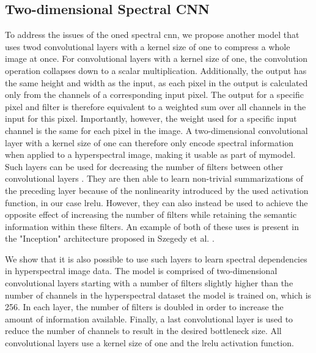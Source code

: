 \subsection{Two-dimensional Spectral CNN\label{sec:fastconv1d}}
To address the issues of the \ac{oned} spectral \ac{cnn}, we propose another model that uses \ac{twod} convolutional layers with a kernel size of one to compress a whole image at once. For convolutional layers with a kernel size of one, the convolution operation collapses down to a scalar multiplication. Additionally, the output has the same height and width as the input, as each pixel in the output is calculated only from the channels of a corresponding input pixel. The output for a specific pixel and filter is therefore equivalent to a weighted sum over all channels in the input for this pixel. Importantly, however, the weight used for a specific input channel is the same for each pixel in the image. A two-dimensional convolutional layer with a kernel size of one can therefore only encode spectral information when applied to a hyperspectral image, making it usable as part of \ac{mymodel}. Such layers can be used for decreasing the number of filters between other convolutional layers \citep{szegedy_going_2014}. They are then able to learn non-trivial summarizations of the preceding layer because of the nonlinearity introduced by the used activation function, in our case \ac{lrelu}. However, they can also instead be used to achieve the opposite effect of increasing the number of filters while retaining the semantic information within these filters. An example of both of these uses is present in the "Inception" architecture proposed in Szegedy et al. \citep{szegedy_going_2014}.

We show that it is also possible to use such layers to learn spectral dependencies in hyperspectral image data. The model is comprised of two-dimensional convolutional layers starting with a number of filters slightly higher than the number of channels in the hyperspectral dataset the model is trained on, which is 256. In each layer, the number of filters is doubled in order to increase the amount of information available. Finally, a last convolutional layer is used to reduce the number of channels to result in the desired bottleneck size. All convolutional layers use a kernel size of one and the \ac{lrelu} activation function.

